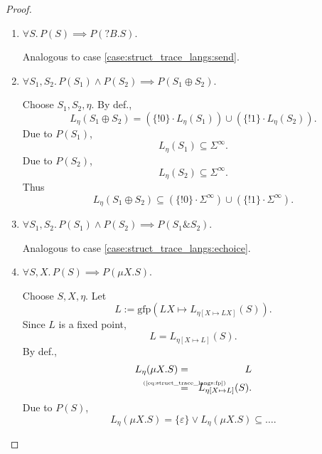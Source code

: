 \documentclass{llncs}
\newcommand*{\gfp}{\mathrm{gfp}}
\newcommand*{\union}{\cup}
\newcommand*{\send}{\mathord{!}}
\newcommand*{\recv}{\mathord{?}}
\newcommand*{\echoice}{\oplus}
\newcommand*{\ichoice}{\mathop{\&}}
\newcommand*{\concat}{\cdot}
\renewcommand*{\|}{\;|\;}
\renewcommand*{\epsilon}{\varepsilon}
\newcommand*{\eqwith}[1]{\mathrel{\overset{\makebox[0pt]{\mbox{\normalfont\tiny\rmfamily #1}}}{=}}}
\begin{document}
\begin{proof}
\begin{enumerate}
    \item
      \label{case:struct_trace_langs:recv}
      $\forall S.\, P(S) \implies P(\recv B.S)$.

      Analogous to case \ref{case:struct_trace_langs:send}.

    \item
      \label{case:struct_trace_langs:echoice}
      $\forall S_1, S_2.\, P(S_1) \land P(S_2) \implies P(S_1 \echoice S_2)$.

      Choose $S_1, S_2, \eta$. By def.,
      \begin{equation*}
        L_\eta(S_1 \echoice S_2) = (\{\send 0\} \concat L_\eta(S_1)) \union (\{\send 1\} \concat L_\eta(S_2)).
      \end{equation*}
      Due to $P(S_1)$,
      \begin{equation*}
        L_\eta(S_1) \subseteq \Sigma^\infty.
      \end{equation*}
      Due to $P(S_2)$,
      \begin{equation*}
        L_\eta(S_2) \subseteq \Sigma^\infty.
      \end{equation*}
      Thus
      \begin{equation*}
        L_\eta(S_1 \echoice S_2) \subseteq (\{\send 0\} \concat \Sigma^\infty) \union (\{\send 1\} \concat \Sigma^\infty).
      \end{equation*}

    \item
      \label{case:struct_trace_langs:ichoice}
      $\forall S_1, S_2.\, P(S_1) \land P(S_2) \implies P(S_1 \ichoice S_2)$.

      Analogous to case \ref{case:struct_trace_langs:echoice}.

    \item
      \label{case:struc_trace_langs:mu}
      $\forall S, X.\, P(S) \implies P(\mu X.S)$.

      Choose $S, X, \eta$.
      Let
      \begin{equation*}
        L := \gfp(LX \mapsto L_{\eta[X \mapsto LX]}(S)).
      \end{equation*}
      Since $L$ is a fixed point,
      \begin{equation}
        \label{eq:struct_trace_langs:fp}
        L = L_{\eta[X \mapsto L]}(S).
      \end{equation}
      By def.,
      \begin{eqnarray*}
        L_\eta(\mu X.S)
          &=& L \\
          &\eqwith{(\ref{eq:struct_trace_langs:fp})}& L_{\eta[X \mapsto L]}(S).
      \end{eqnarray*}
      Due to $P(S)$,
      \begin{equation*}
        L_\eta(\mu X.S) = \{\epsilon\} \lor L_\eta(\mu X.S) \subseteq \dots.
      \end{equation*}
  \end{enumerate}
\end{proof}
\end{document}
